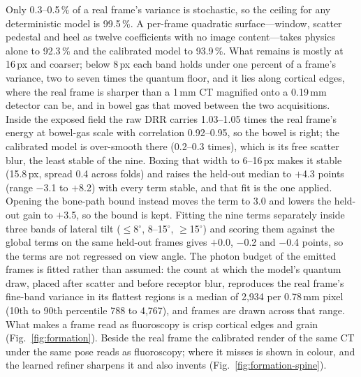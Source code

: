 \documentclass[11pt,letterpaper]{article}
\begin{document}
Only 0.3--0.5\,\% of a real frame's variance is stochastic, so the ceiling for any deterministic model
is 99.5\,\%. A per-frame quadratic surface---window, scatter pedestal and heel as twelve coefficients
with no image content---takes physics alone to 92.3\,\% and the calibrated model to 93.9\,\%. What
remains is mostly at 16\,px and coarser; below 8\,px each band holds under one percent of a frame's
variance, two to seven times the quantum floor, and it lies along cortical edges, where the real frame is
sharper than a 1\,mm CT magnified onto a 0.19\,mm detector can be, and in bowel gas that moved between the
two acquisitions. Inside the exposed
field the raw DRR carries 1.03--1.05 times the real frame's energy at bowel-gas scale with correlation
0.92--0.95, so the bowel is right; the calibrated model is over-smooth there (0.2--0.3 times), which is
its free scatter blur, the least stable of the nine. Boxing that width to 6--16\,px makes it stable
(15.8\,px, spread 0.4 across folds) and raises the held-out median to $+$4.3 points (range $-$3.1 to
$+$8.2) with every term stable, and that fit is the one applied. Opening the bone-path bound instead moves
the term to 3.0 and lowers the held-out gain to $+$3.5, so the bound is kept. Fitting the nine terms
separately inside three bands of lateral tilt ($\le$8$^\circ$, 8--15$^\circ$, $\ge$15$^\circ$) and scoring them
against the global terms on the same held-out frames gives $+$0.0, $-$0.2 and $-$0.4 points, so the terms
are not regressed on view angle. The photon budget of the emitted frames is fitted rather than assumed:
the count at which the model's quantum draw, placed after scatter and before receptor blur, reproduces
the real frame's fine-band variance in its flattest regions is a median of 2{,}934 per 0.78\,mm pixel
(10th to 90th percentile 788 to 4{,}767), and frames are drawn across that range. What makes a
frame read as fluoroscopy is crisp cortical edges and grain (Fig.~\ref{fig:formation}). Beside the real frame the calibrated render of the same CT under the same pose reads as fluoroscopy; where
it misses is shown in colour, and the learned refiner sharpens it and also invents (Fig.~\ref{fig:formation-spine}).
\end{document}
